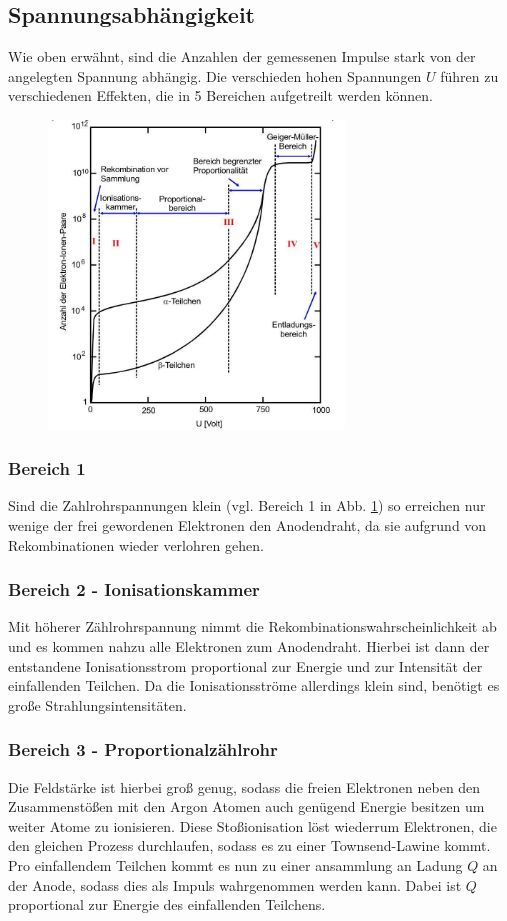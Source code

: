 \subsection{Spannungsabhängigkeit}
Wie oben erwähnt, sind die Anzahlen der gemessenen Impulse stark von 
der angelegten Spannung abhängig. Die verschieden hohen Spannungen $U$ 
führen zu verschiedenen Effekten, die in 5 Bereichen aufgetreilt werden können.

\begin{figure}
    \centering
    \includegraphics[width=0.7\textwidth]{input/bereiche.jpg}
    \caption{}
    \label{fig:bereiche}
\end{figure}
\subsubsection*{Bereich 1}
Sind die Zahlrohrspannungen klein (vgl. Bereich 1 in Abb. \ref{fig:bereiche})
so erreichen nur wenige der frei gewordenen Elektronen den Anodendraht, da 
sie aufgrund von Rekombinationen wieder verlohren gehen.
\subsubsection*{Bereich 2 - Ionisationskammer}
Mit höherer Zählrohrspannung nimmt die Rekombinationswahrscheinlichkeit ab und
es kommen nahzu alle Elektronen zum Anodendraht. Hierbei ist dann der entstandene
Ionisationsstrom proportional zur Energie und zur Intensität der einfallenden Teilchen.
Da die Ionisationsströme allerdings klein sind, benötigt es große Strahlungsintensitäten.
\subsubsection*{Bereich 3 - Proportionalzählrohr}
Die Feldstärke ist hierbei groß genug, sodass die freien Elektronen neben den Zusammenstößen
mit den Argon Atomen auch genügend Energie besitzen um weiter Atome zu ionisieren. Diese 
Stoßionisation löst wiederrum Elektronen, die den gleichen Prozess durchlaufen, sodass es zu einer Townsend-Lawine
kommt. Pro einfallendem Teilchen kommt es nun zu einer ansammlung an Ladung $Q$ an der Anode,
sodass dies als Impuls wahrgenommen werden kann. Dabei ist $Q$ proportional zur
Energie des einfallenden Teilchens.
